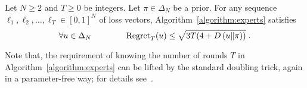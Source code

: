 \begin{theorem}
\label{theorem:experts-regret}
Let $N \ge 2$ and $T \ge 0$ be integers. Let $\pi \in \Delta_N$ be a prior.
For any sequence $\ell_1, \ell_2, \dots, \ell_T \in
[0,1]^N$ of loss vectors, Algorithm~\ref{algorithm:experts}
satisfies
$$
\forall u \in \Delta_N \qquad \qquad \operatorname{Regret}_T(u) \le \sqrt{3T (4 + D\left({u}\middle\|{\pi}\right))} \; .
$$
\end{theorem}

Note that, the requirement of knowing the number of rounds $T$ in Algorithm~\ref{algorithm:experts} can be lifted by
the standard doubling trick, again in a parameter-free way; for details
see~\cite{Orabona-Pal-2016-parameter-free}.


